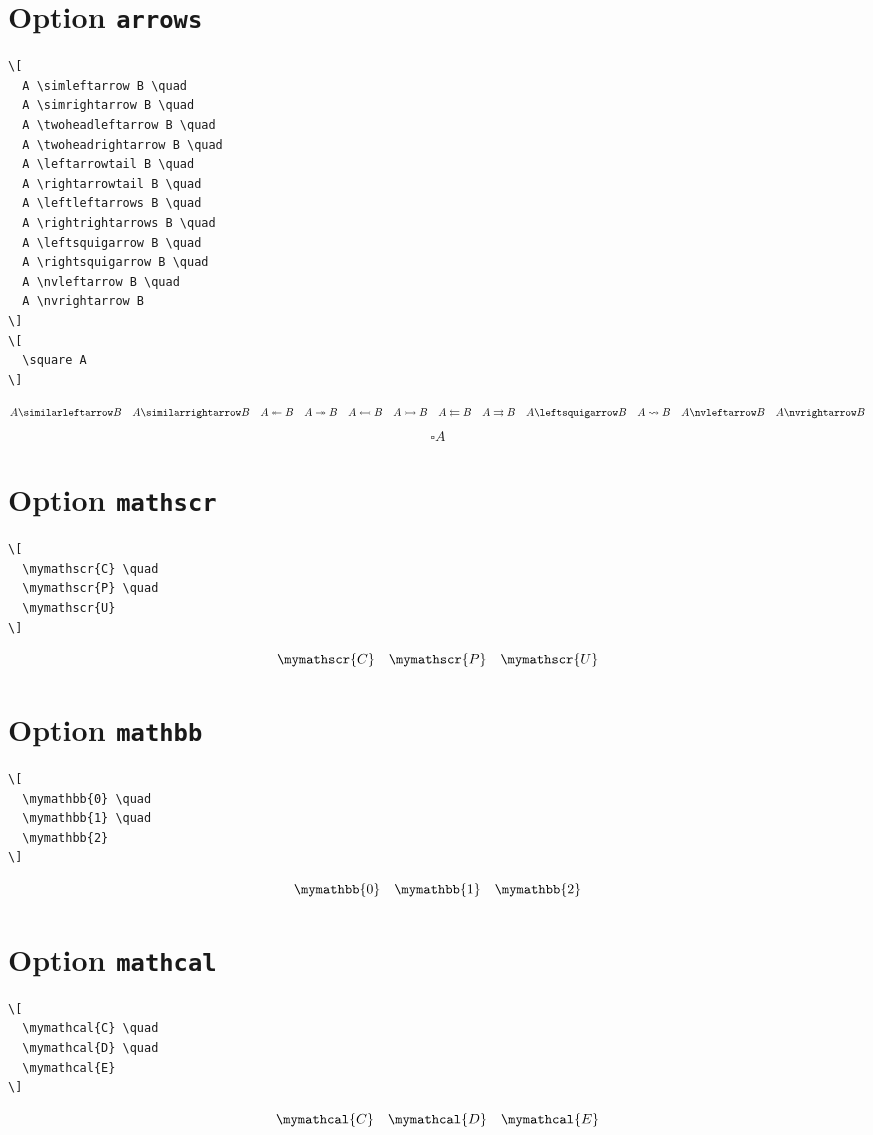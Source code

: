 \documentclass{article}
\begin{document}
\section{Option \texttt{arrows}}

\begin{verbatim}
\[
  A \simleftarrow B \quad
  A \simrightarrow B \quad
  A \twoheadleftarrow B \quad
  A \twoheadrightarrow B \quad
  A \leftarrowtail B \quad
  A \rightarrowtail B \quad
  A \leftleftarrows B \quad
  A \rightrightarrows B \quad
  A \leftsquigarrow B \quad
  A \rightsquigarrow B \quad
  A \nvleftarrow B \quad
  A \nvrightarrow B
\]
\[
  \square A
\]
\end{verbatim}
%
\[
  A \simleftarrow B \quad
  A \simrightarrow B \quad
  A \twoheadleftarrow B \quad
  A \twoheadrightarrow B \quad
  A \leftarrowtail B \quad
  A \rightarrowtail B \quad
  A \leftleftarrows B \quad
  A \rightrightarrows B \quad
  A \leftsquigarrow B \quad
  A \rightsquigarrow B \quad
  A \nvleftarrow B \quad
  A \nvrightarrow B
\]
\[
  \square A
\]

\section{Option \texttt{mathscr}}

\begin{verbatim}
\[
  \mymathscr{C} \quad
  \mymathscr{P} \quad
  \mymathscr{U}
\]
\end{verbatim}
%
\[
  \mymathscr{C} \quad
  \mymathscr{P} \quad
  \mymathscr{U}
\]

\section{Option \texttt{mathbb}}

\begin{verbatim}
\[
  \mymathbb{0} \quad
  \mymathbb{1} \quad
  \mymathbb{2}
\]
\end{verbatim}
%
\[
  \mymathbb{0} \quad
  \mymathbb{1} \quad
  \mymathbb{2}
\]

\section{Option \texttt{mathcal}}

\begin{verbatim}
\[
  \mymathcal{C} \quad
  \mymathcal{D} \quad
  \mymathcal{E}
\]
\end{verbatim}
%
\[
  \mymathcal{C} \quad
  \mymathcal{D} \quad
  \mymathcal{E}
\]
\end{document}
